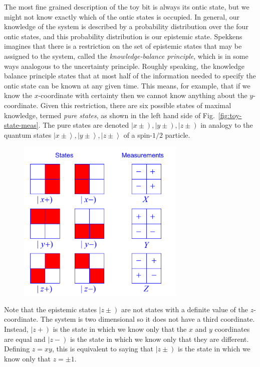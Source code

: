 \documentclass[DIV=calc,paper=a4,fontsize=11pt,twocolumn]{scrartcl} %
\theoremstyle{definition}
\theoremstyle{plain}
\newcommand{\RKet}[1]{\ensuremath{\left \vert #1 \right )}}
\newcommand{\Ket}[1]{\ensuremath{\left \vert #1 \right \rangle}}
\begin{document}
The most fine grained description of the toy bit is always its ontic
state, but we might not know exactly which of the ontic states is
occupied.  In general, our knowledge of the system is described by a
probability distribution over the four ontic states, and this
probability distribution is our epistemic state.  Spekkens imagines
that there is a restriction on the set of epistemic states that may be
assigned to the system, called the \emph{knowledge-balance principle},
which is in some ways analogous to the uncertainty principle.  Roughly
speaking, the knowledge balance principle states that at most half of
the information needed to specify the ontic state can be known at any
given time.  This means, for example, that if we know the
$x$-coordinate with certainty then we cannot know anything about the
$y$-coordinate.  Given this restriction, there are six possible states
of maximal knowledge, termed \emph{pure states}, as shown in the left
hand side of Fig.~\ref{fig:toy-state-meas}.  The pure states are
denoted $\RKet{x \pm}, \RKet{y \pm}, \RKet{z \pm}$ in analogy to the
quantum states $\Ket{x \pm}, \Ket{y \pm}, \Ket{z \pm}$ of a spin-$1/2$
particle.
\begin{figure}[t!]
\centering
\includegraphics[width=80mm]{Fig3.pdf}
\caption{}
\end{figure}
Note that the epistemic states $\RKet{z \pm}$ are not states with a
definite value of the $z$-coordinate.  The system is two dimensional
so it does not have a third coordinate.  Instead, $\RKet{z+}$ is the
state in which we know only that the $x$ and $y$ coordinates are equal
and $\RKet{z-}$ is the state in which we know only that they are
different.  Defining $z=xy$, this is equivalent to saying that
$\RKet{z \pm}$ is the state in which we know only that $z = \pm 1$.
\end{document}
